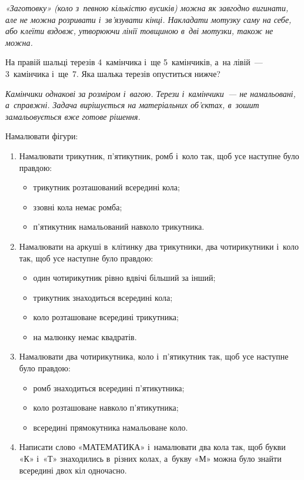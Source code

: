 \emph{
«Заготовку» (коло з~певною кількістю вусиків) можна як завгодно вигинати,
але не можна розривати і~зв'язувати кінці.
Накладати мотузку саму на себе, або клеїти вздовж,
утворюючи лінії товщиною в~дві мотузки, також не можна.
}


\problem
На правій шальці терезів 4~камінчика і~ще 5~камінчиків,
а~на лівій~--- 3~камінчика і~ще~7.
Яка шалька терезів опуститься нижче? 

\emph{
Камінчики однакові за розміром і~вагою.
Терези і~камінчики~--- не намальовані, а~справжні.
Задача вирішується на матеріальних об’єктах,
в~зошит замальовується вже готове рішення.
}


\problem
Намалювати фігури:
\begin{enumerate}
    \item Намалювати трикутник, п'ятикутник, ромб і~коло так,
    щоб усе наступне було правдою:
    \begin{itemize}
        \item трикутник розташований всередині кола;
        \item ззовні кола немає ромба;
        \item п'ятикутник намальований навколо трикутника.
    \end{itemize}
    \item Намалювати на аркуші в~клітинку два трикутники,
    два чотирикутники і~коло так, щоб усе наступне було правдою:
    \begin{itemize}
        \item один чотирикутник рівно вдвічі більший за інший;
        \item трикутник знаходиться всередині кола;
        \item коло розташоване всередині трикутника;
        \item на малюнку немає квадратів.
    \end{itemize}
    \item Намалювати два чотирикутника, коло і~п'ятикутник так,
    щоб усе наступне було правдою:
    \begin{itemize}
        \item ромб знаходиться всередині п'ятикутника;
        \item коло розташоване навколо п'ятикутника;
        \item всередині прямокутника намальоване коло.
    \end{itemize}
    \item Написати слово «МАТЕМАТИКА» і~намалювати два кола так,
    щоб букви «К» і~«Т» знаходились в~різних колах,
    а~букву «М» можна було знайти всередині двох кіл одночасно.
\end{enumerate}


